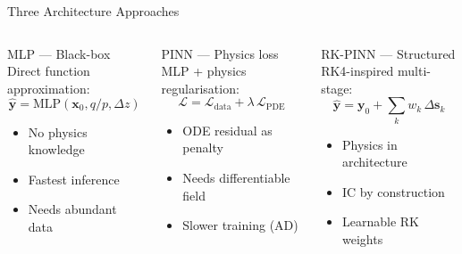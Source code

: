 \documentclass[aspectratio=169, 11pt]{beamer}
\newcommand{\vb}[1]{\bm{#1}}
\begin{document}
\begin{frame}{Three Architecture Approaches}
  \begin{columns}[T]
    \begin{block}{\textcolor{nngreen}{MLP} --- Black-box}
      Direct function approximation:
      \[
        \hat{\vb{y}} = \text{MLP}(\vb{x}_0, q/p, \Delta z)
      \]
      \begin{itemize}
        \item No physics knowledge
        \item Fastest inference
        \item Needs abundant data
      \end{itemize}
    \end{block}

    \begin{block}{\textcolor{rkorange}{PINN} --- Physics loss}
      MLP + physics regularisation:
      \[
        \mathcal{L} = \mathcal{L}_\text{data} + \lambda\,\mathcal{L}_\text{PDE}
      \]
      \begin{itemize}
        \item ODE residual as penalty
        \item Needs differentiable field
        \item Slower training (AD)
      \end{itemize}
    \end{block}

    \begin{block}{\textcolor{lhcbblue}{RK-PINN} --- Structured}
      RK4-inspired multi-stage:
      \[
        \hat{\vb{y}} = \vb{y}_0 + \sum_k w_k\,\Delta\vb{s}_k
      \]
      \begin{itemize}
        \item Physics in architecture
        \item IC by construction
        \item Learnable RK weights
      \end{itemize}
    \end{block}
  \end{columns}

  \bigskip
  \centering
\end{frame}
\end{document}
